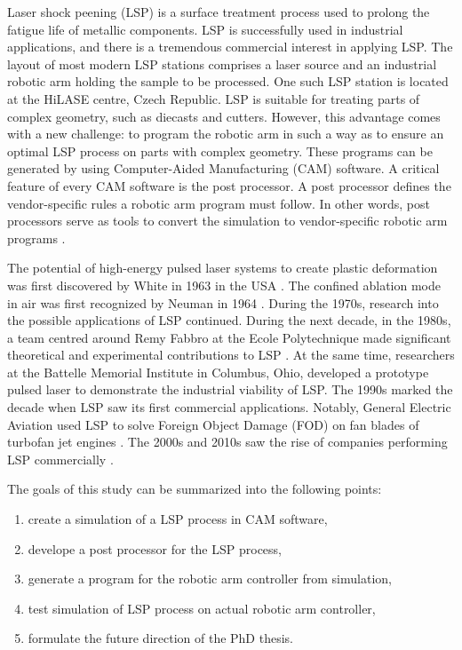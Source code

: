 \label{sec:introduction}

Laser shock peening (LSP) is a surface treatment process used to prolong the fatigue life of metallic components. LSP is successfully used in industrial applications, and there is a tremendous commercial interest in applying LSP. The layout of most modern LSP stations comprises a laser source and an industrial robotic arm holding the sample to be processed. One such LSP station is located at the HiLASE centre, Czech Republic. LSP is suitable for treating parts of complex geometry, such as diecasts and cutters. However, this advantage comes with a new challenge: to program the robotic arm in such a way as to ensure an optimal LSP process on parts with complex geometry. These programs can be generated by using Computer-Aided Manufacturing (CAM) software. A critical feature of every CAM software is the post processor. A post processor defines the vendor-specific rules a robotic arm program must follow.  In other words, post processors serve as tools to convert the simulation to vendor-specific robotic arm programs \cite{ding_ye_2006}.

The potential of high-energy pulsed laser systems to create plastic deformation was first discovered by White in 1963 in the USA \cite{white_1963}. The confined ablation mode in air was first recognized by Neuman in 1964 \cite{neuman_1964}. During the 1970s, research into the possible applications of LSP continued. During the next decade, in the 1980s, a team centred around Remy Fabbro at the Ecole Polytechnique made significant theoretical and experimental contributions to LSP \cite{fabbro_fournier_ballard_devaux_virmont_1990}. At the same time, researchers at the Battelle Memorial Institute in Columbus, Ohio, developed a prototype pulsed laser to demonstrate the industrial viability of LSP. The 1990s marked the decade when LSP saw its first commercial applications. Notably, General Electric Aviation used LSP to solve Foreign Object Damage (FOD) on fan blades of turbofan jet engines \cite{airforce}. The 2000s and 2010s saw the rise of companies performing LSP commercially \cite{sano}.

The goals of this study can be summarized into the following points:
\begin{enumerate}

    \item create a simulation of a LSP process in CAM software,
    \item develope a post processor for the LSP process, 
    \item generate a program  for the robotic arm controller from simulation,
    \item test simulation of LSP process on actual robotic arm controller,
    \item formulate the future direction of the PhD thesis.
    
\end{enumerate}

